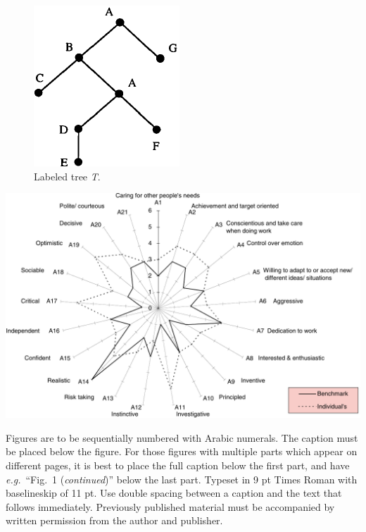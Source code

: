 \documentclass{ws-jai}
\begin{document}
\begin{figure}[h]
\begin{center}
\includegraphics{jaif1} %
\end{center}
\caption{Labeled tree {\it T}.}
\label{aba:fig1}
\end{figure}

\begin{rotatefigure}
\begin{center}
\includegraphics[width=7in]{jaif2}
\end{center}
\caption{The bifurcating response curves of system
$\alpha=0.5, \beta=1.8; \delta=0.2, \gamma=0$: (a)
$\mu=-1.3$; and (b) $\mu=0.3$.}
\label{aba:fig2}
\end{rotatefigure}

Figures are to be sequentially numbered with Arabic
numerals. The caption must be placed below the figure. For those
figures with multiple parts which appear on different pages, it is
best to place the full caption below the first part, and have
{\it e.g.}~``Fig.~1 ({\it continued})'' below the last part. Typeset in
9 pt Times Roman with baselineskip of 11 pt. Use double spacing
between a caption and the text that follows immediately.
Previously published material must be accompanied by written
permission from the author and publisher.
\end{document}

